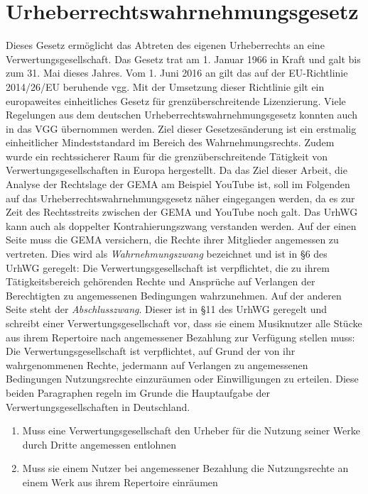 \section{Urheberrechtswahrnehmungsgesetz}
\label{vgg}
Dieses Gesetz ermöglicht das Abtreten des eigenen Urheberrechts an eine Verwertungsgesellschaft. Das Gesetz trat am 1. Januar 1966 in Kraft und galt bis zum 31. Mai dieses Jahres. Vom 1. Juni 2016 an gilt das auf der EU-Richtlinie 2014/26/EU beruhende \gls{vgg}. Mit der Umsetzung dieser Richtlinie gilt ein europaweites einheitliches Gesetz für grenzüberschreitende Lizenzierung. Viele Regelungen aus dem deutschen Urheberrechtswahrnehmungsgesetz konnten auch in das VGG übernommen werden. Ziel dieser Gesetzesänderung ist ein erstmalig einheitlicher Mindeststandard im Bereich des Wahrnehmungsrechts. Zudem wurde ein rechtssicherer Raum für die grenzüberschreitende Tätigkeit von Verwertungsgesellschaften in Europa hergestellt.
\newline
\newline
Da das Ziel dieser Arbeit, die Analyse der Rechtslage der GEMA am Beispiel YouTube ist, soll im Folgenden auf das Urheberrechtswahrnehmungsgesetz näher eingegangen werden, da es zur Zeit des Rechtsstreits zwischen der GEMA und YouTube noch galt. 
\newline
\newline
Das UrhWG kann auch als doppelter Kontrahierungszwang verstanden werden. Auf der einen Seite muss die GEMA versichern, die Rechte ihrer Mitglieder angemessen zu vertreten. Dies wird als \textit{Wahrnehmungszwang} bezeichnet und ist in §6 des UrhWG geregelt: \glqq Die Verwertungsgesellschaft ist verpflichtet, die zu ihrem Tätigkeitsbereich gehörenden Rechte und Ansprüche auf Verlangen der Berechtigten zu angemessenen Bedingungen wahrzunehmen.\grqq{}
\newline
Auf der anderen Seite steht der \textit{Abschlusszwang}. Dieser ist in §11 des UrhWG geregelt und schreibt einer Verwertungsgesellschaft vor, dass sie einem Musiknutzer alle Stücke aus ihrem Repertoire nach angemessener Bezahlung zur Verfügung stellen muss: \glqq Die Verwertungsgesellschaft ist verpflichtet, auf Grund der von ihr wahrgenommenen Rechte, jedermann auf Verlangen zu angemessenen Bedingungen Nutzungsrechte einzuräumen oder Einwilligungen zu erteilen.\grqq{}
\newline
\newline
Diese beiden Paragraphen regeln im Grunde die Hauptaufgabe der Verwertungsgesellschaften in Deutschland.
\begin{enumerate}
\item Muss eine Verwertungsgesellschaft den Urheber für die Nutzung seiner Werke durch Dritte angemessen entlohnen
\item Muss sie einem Nutzer bei angemessener Bezahlung die Nutzungsrechte an einem Werk aus ihrem Repertoire einräumen 
\end{enumerate} 

